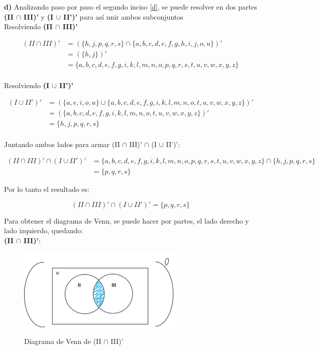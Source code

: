 \newpage

\textbf{d)} Analizando paso por paso el segundo inciso \ref{d}, se puede resolver en dos partes \textbf{(II $\cap$ III)'} y \textbf{(I $\cup$ II')'} para así unir ambos subconjuntos \\

Resolviendo \textbf{(II $\cap$ III)'}

\begin{align*}
 (II \cap III)' &=( \{ h, j, p, q, r, s  \} \cap \{ a, b, c, d, e, f, g, h, i, j, o, u  \}    )'  \\
  &=   (\{ h, j \})'       \\
    &=   \{ a, b, c, d, e, f, g, i, k, l, m, n, o, p, q, r, s, t, u, v, w, x, y, z \}        \\
\end{align*}

Resolviendo \textbf{(I $\cup$ II')'}

\begin{align*}
(I \cup II')'  &=  ( \{a, e, i, o, u\} \cup \{ a, b, c, d, e, f, g, i, k, l, m, n, o, t, u, v, w, x, y, z \}  )'\\
  &=  ( \{ a, b, c, d, e, f, g, i, k, l, m, n, o, t, u, v, w, x, y, z \}  )' \\
  &=       \{h, j, p, q, r, s \}\\
\end{align*}

Juntando ambos lados para armar (II $\cap$ III)' $\cap$ (I $\cup$ II')':

\begin{align*}
(II \cap III)' \cap (I \cup II')' &= \{ a, b, c, d, e, f, g, i, k, l, m, n, o, p, q, r, s, t, u, v, w, x, y, z \} \cap \{h, j, p, q, r, s \} \\
  &= \{p, q, r, s \}
\end{align*}

Por lo tanto el resultado es:

\begin{equation*}
    \boxed{ (II \cap III)' \cap (I \cup II')' =   \{p, q, r, s \}   }
\end{equation*}




Para obtener el diagrama de Venn, se puede hacer por partes, el lado derecho y lado izquierdo, quedando: \\

\textbf{(II $\cap$ III)'}: 

\begin{figure}[htbp]
\centering
\includegraphics[width=8cm]{d/aa.png}
\caption[]{Diagrama de Venn de (II $\cap$ III)'}
\end{figure} 

